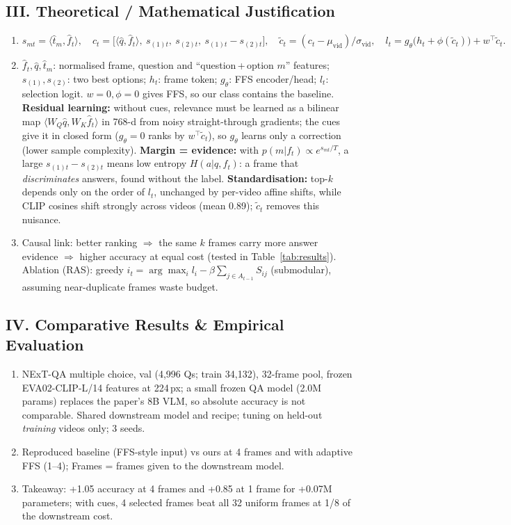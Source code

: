 \documentclass[8pt,a4paper]{article}
\begin{document}
\subsection*{III. Theoretical / Mathematical Justification}
\begin{enumerate}
    \item $s_{mt}=\langle\hat t_m,\hat f_t\rangle,\quad c_t=\big[\langle\hat q,\hat f_t\rangle,\ s_{(1)t},\ s_{(2)t},\ s_{(1)t}-s_{(2)t}\big],\quad \tilde c_t=(c_t-\mu_{\mathrm{vid}})/\sigma_{\mathrm{vid}},\quad l_t=g_\theta\big(h_t+\phi(\tilde c_t)\big)+w^\top\tilde c_t.$
    \item $\hat f_t,\hat q,\hat t_m$: normalised frame, question and ``question\,+\,option $m$'' features; $s_{(1)},s_{(2)}$: two best options; $h_t$: frame token; $g_\theta$: FFS encoder/head; $l_t$: selection logit. $w{=}0,\phi{=}0$ gives FFS, so our class contains the baseline. \textbf{Residual learning:} without cues, relevance must be learned as a bilinear map $\langle W_Q\hat q,W_K\hat f_t\rangle$ in 768-d from noisy straight-through gradients; the cues give it in closed form ($g_\theta{=}0$ ranks by $w^\top\tilde c_t$), so $g_\theta$ learns only a correction (lower sample complexity). \textbf{Margin = evidence:} with $p(m|f_t)\propto e^{s_{mt}/T}$, a large $s_{(1)t}-s_{(2)t}$ means low entropy $H(a|q,f_t)$: a frame that \emph{discriminates} answers, found without the label. \textbf{Standardisation:} top-$k$ depends only on the order of $l_t$, unchanged by per-video affine shifts, while CLIP cosines shift strongly across videos (mean 0.89); $\tilde c_t$ removes this nuisance.
    \item Causal link: better ranking $\Rightarrow$ the same $k$ frames carry more answer evidence $\Rightarrow$ higher accuracy at equal cost (tested in Table~\ref{tab:results}). Ablation (RAS): greedy $i_t=\arg\max_i l_i-\beta\sum_{j\in A_{t-1}}S_{ij}$ (submodular), assuming near-duplicate frames waste budget.
\end{enumerate}

\subsection*{IV. Comparative Results \& Empirical Evaluation}
\begin{enumerate}
    \item NExT-QA multiple choice, val (4,996 Qs; train 34,132), 32-frame pool, frozen EVA02-CLIP-L/14 features at 224\,px; a small frozen QA model (2.0M params) replaces the paper's 8B VLM, so absolute accuracy is not comparable. Shared downstream model and recipe; tuning on held-out \emph{training} videos only; 3 seeds.
    \item Reproduced baseline (FFS-style input) vs ours at 4 frames and with adaptive FFS (1--4); Frames = frames given to the downstream model.
    \item Takeaway: +1.05 accuracy at 4 frames and +0.85 at 1 frame for +0.07M parameters; with cues, 4 selected frames beat all 32 uniform frames at 1/8 of the downstream cost.
\end{enumerate}
\end{document}

